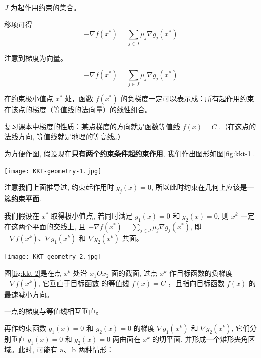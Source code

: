 $J$ 为起作用约束的集合。

移项可得 $$ -\nabla f\left({x}^{*}\right)=\sum_{j \in J} \mu_{j} \nabla g_{j}\left({x}^{*}\right) $$

注意到梯度为向量。 

\begin{theorem}
    $$ -\nabla f\left({x}^{*}\right)=\sum_{j \in J} \mu_{j} \nabla g_{j}\left({x}^{*}\right) $$

    在约束极小值点 $ {x}^{*} $ 处，函数 $ f\left({x}^{*}\right) $ 的负梯度一定可以表示成：所有起作用约束在该点的梯度（等值线的法向量）的线性组合。
\end{theorem}


\begin{corollary}[梯度的性质]
    复习课本中梯度的性质：某点梯度的方向就是函数等值线 $ f({x})=C $ .（在这点的法线方向, 等值线就是地理的等高线。）
\end{corollary}

为方便作图, 假设现在\textbf{只有两个约束条件起约束作用}, 我们作出图形如图\ref{fig:kkt-1}.

\begin{FigureCenter}{}
    \label{fig:kkt-1}
    \texttt{[image: KKT-geometry-1.jpg]}
\end{FigureCenter}


注意我们上面推导过, 约束起作用时 $ g_{j}({x})=0 $, 所以此时约束在几何上应该是一簇\textbf{约束平面}.

我们假设在 $ {x}^{*} $ 取得极小值点, 若同时满足 $ g_{1}({x})=0 $ 和 $ g_{2}({x})=0 $, 则 $ {x}^{k} $ 一定在这两个平面的交线上, 且 $ -\nabla f\left({x}^{*}\right)=\sum_{j \in J} \mu_{j} \nabla g_{j}\left({x}^{*}\right) $, 即 $ -\nabla f\left({x}^{k}\right) 、 \nabla g_{1}\left({x}^{k}\right) $ 和 $ \nabla g_{2}\left({x}^{k}\right) $ 共面。

\begin{FigureCenter}{}
    \label{fig:kkt-2}
    \texttt{[image: KKT-geometry-2.jpg]}
\end{FigureCenter}

图\ref{fig:kkt-2}是在点 $ {x}^{k} $ 处沿 $ x_{1} O x_{2} $ 面的截面, 过点 $ {x}^{k} $ 作目标函数的负梯度 $ -\nabla f\left({x}^{k}\right) $, 它垂直于目标函数 的等值线 $ f({x})=C $ ，且指向目标函数 $ f({x}) $ 的最速减小方向。

\begin{corollary}
    一点的梯度与等值线相互垂直。
\end{corollary}

再作约束函数 $ g_{1}({x})=0 $ 和 $ g_{2}({x})=0 $ 的梯度 $ \nabla g_{1}\left({x}^{k}\right) $ 和 $ \nabla g_{2}\left({x}^{k}\right) $, 它们分别垂直 $ g_{1}({x})=0 $ 和 $ g_{2}({x})=0 $ 两曲面在 $ {x}^{k} $ 的切平面, 并形成一个雉形夹角区域。此时, 可能有 $ \mathrm{a} 、 \mathrm{~b} $ 两种情形：

